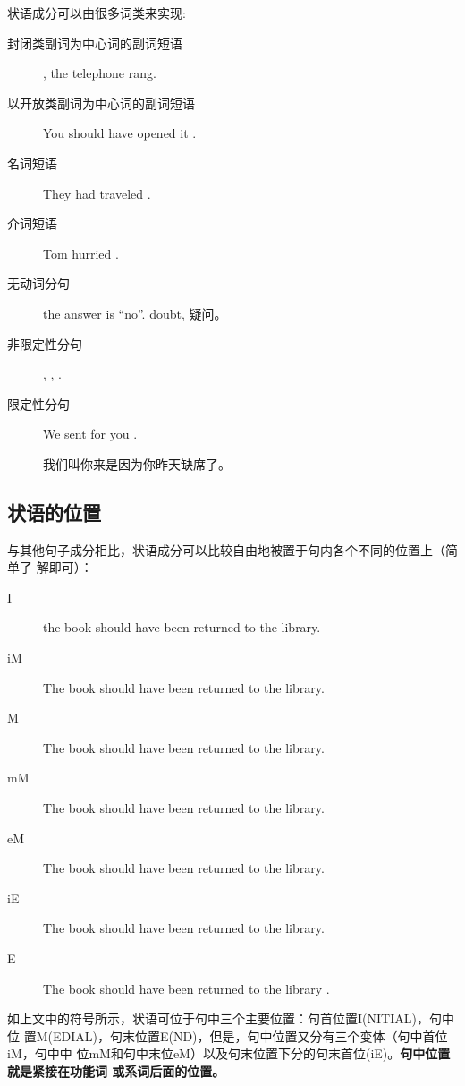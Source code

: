 状语成分可以由很多词类来实现:
\begin{description}
\item[封闭类副词为中心词的副词短语] , the telephone rang.
\item[以开放类副词为中心词的副词短语] You should have opened it .
\item[名词短语] They had traveled .
\item[介词短语] Tom hurried .
\item[无动词分句]  the answer is ``no''. doubt, 疑问。
\item[非限定性分句]  , , .
\item[限定性分句] We sent for you .

  我们叫你来是因为你昨天缺席了。
\end{description}

\subsection{状语的位置}

与其他句子成分相比，状语成分可以比较自由地被置于句内各个不同的位置上（简单了
解即可）：
\begin{description}
\item[I]  the book should have been returned to the library.
\item[iM] The book  should have been returned to the library.
\item[M] The book should  have been returned to the library.
\item[mM] The book should have  been returned to the library.
\item[eM] The book should have been  returned to the library.
\item[iE] The book should have been returned  to the library.
\item[E] The book should have been returned to the library .
\end{description}

如上文中的符号所示，状语可位于句中三个主要位置：句首位置I(NITIAL)，句中位
置M(EDIAL)，句末位置E(ND)，但是，句中位置又分有三个变体（句中首位iM，句中中
位mM和句中末位eM）以及句末位置下分的句末首位(iE)。\textbf{句中位置就是紧接在功能词
  或系词后面的位置。}

